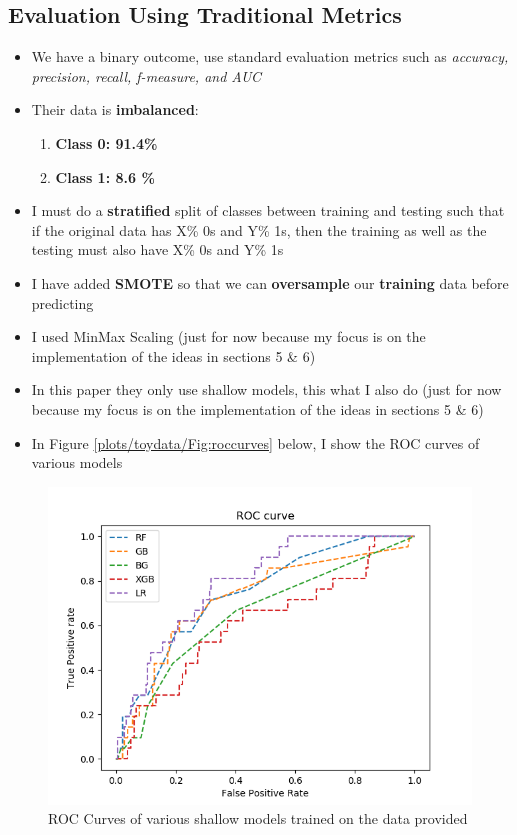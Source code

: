 \documentclass[11pt]{article}
\begin{document}
\subsection{Evaluation Using Traditional Metrics}
\begin{itemize}
\item We have a binary outcome, use standard evaluation metrics such as \textit{accuracy, precision, recall, f-measure, and AUC}
\item Their data is \textbf{imbalanced}:
\begin{enumerate}
\item \textbf{Class 0: 91.4\%}
\item \textbf{Class 1: 8.6 \%}
\end{enumerate}

\item I must do a \textbf{stratified} split of classes between training and testing such that if the original data has X\% 0s and Y\% 1s, then the training as well as the testing must also have X\% 0s and Y\%  1s

\item I have added \textbf{SMOTE} so that we can \textbf{oversample} our \textbf{training} data before predicting

\item I used MinMax Scaling (just for now because my focus is on the implementation of the ideas in sections 5 \& 6)

\item In this paper they only use shallow models, this what I also do (just for now because my focus is on the implementation of the ideas in sections 5 \& 6)

\item In Figure \ref{plots/toydata/Fig:roccurves} below, I show the ROC curves of various models
\end{itemize}

\begin{figure}[H]
\centering
\includegraphics[scale=0.5]{plots/toydata/roccurves.png}
\caption{ROC Curves of various shallow models trained on the data provided}
\label{Fig:roccurves}
\end{figure}
\end{document}
